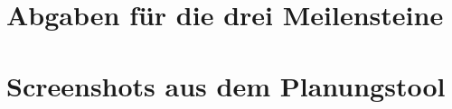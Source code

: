 
%

\chapter{Abgaben für die drei Meilensteine}




\chapter{Screenshots aus dem Planungstool}\label{sec:planungstool}


